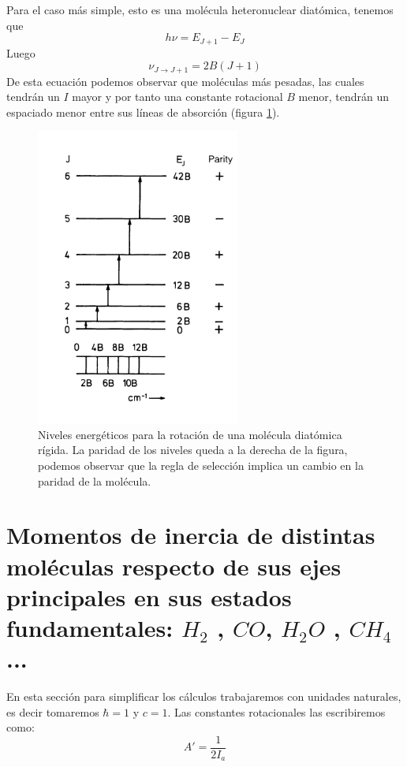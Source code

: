 \documentclass[a4paper]{article}
\begin{document}
Para el caso más simple, esto es una molécula heteronuclear diatómica, tenemos que 
\begin{equation}
h\nu = E_{J+1}-E_{J}
\end{equation}
Luego
\begin{equation}
\nu_{J \rightarrow J+1} = 2B(J+1)
\end{equation}
De esta ecuación podemos observar que moléculas más pesadas, las cuales tendrán un $I$ mayor y por tanto una constante rotacional $B$ menor, tendrán un espaciado menor entre sus líneas de absorción (figura \ref{niveles1}).
\begin{figure}
\includegraphics[width=0.6\textwidth]{niveles1.png}
\caption{Niveles energéticos para la rotación de una molécula diatómica rígida. La paridad de los niveles queda a la derecha de la figura, podemos observar que la regla de selección implica un cambio en la paridad de la molécula.}
\label{niveles1}
\end{figure}
\section{Momentos de inercia de distintas moléculas respecto de sus ejes principales en sus estados fundamentales: $H_2$ , $CO$, $H_2O$ , $CH_4$ ...}
En esta sección  para simplificar los cálculos trabajaremos con unidades naturales, es decir tomaremos $\hbar = 1$ y $c=1$.
Las constantes rotacionales las escribiremos como:
$$A' = \frac{1}{2I_a}$$
\end{document}

